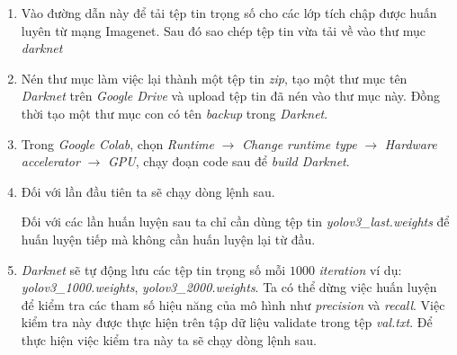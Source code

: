 \begin{enumerate}
	\item Vào đường dẫn này để tải tệp tin trọng số cho các lớp tích chập được huấn luyên từ mạng Imagenet. Sau đó sao chép tệp tin vừa tải về vào thư mục \emph{darknet}
	
\noindent{}	
	
	\item Nén thư mục làm việc lại thành một tệp tin \emph{zip}, tạo một thư mục tên \emph{Darknet} trên \emph{Google Drive} và upload tệp tin đã nén vào thư mục này. Đồng thời tạo một thư mục con có tên \emph{backup} trong \emph{Darknet}.
	
	\item Trong \emph{Google Colab}, chọn \emph{Runtime} $\rightarrow$ \emph{Change runtime type} $\rightarrow$ \emph{Hardware accelerator} $\rightarrow$ \emph{GPU}, chạy đoạn code sau để \emph{build Darknet}.

\noindent{}

	\item Đối với lần đầu tiên ta sẽ chạy dòng lệnh sau.
	
\noindent{}	
	Đối với các lần huấn luyện sau ta chỉ cần dùng tệp tin \emph{yolov3{\_}last.weights} để huấn luyện tiếp mà không cần huấn luyện lại từ đầu.
	
\noindent{}

	\item \emph{Darknet} sẽ tự động lưu các tệp tin trọng số mỗi $1000$ \emph{iteration} ví dụ: \emph{yolov3{\_}1000.weights}, \emph{yolov3{\_}2000.weights}. Ta có thể dừng việc huấn luyện để kiểm tra các tham số hiệu năng của mô hình như \emph{precision} và \emph{recall}. Việc kiểm tra này được thực hiện trên tập dữ liệu validate trong tệp \emph{val.txt}. Để thực hiện việc kiểm tra này ta sẽ chạy dòng lệnh sau.
	

\end{enumerate}
